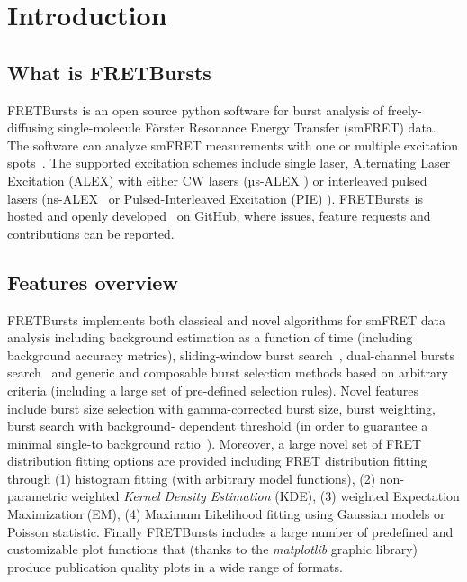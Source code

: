\section{Introduction}

\subsection{What is FRETBursts}

FRETBursts is an open source python software for burst analysis of freely-diffusing 
single-molecule Förster Resonance Energy Transfer (smFRET) data. 
The software can analyze smFRET measurements
with one or multiple excitation spots~\cite{Ingargiola_2013}. The supported 
excitation schemes include single laser, Alternating Laser Excitation (ALEX) 
with either CW lasers (µs-ALEX \cite{Kapanidis_2005}) 
or interleaved pulsed lasers (ns-ALEX~\cite{Laurence_2005} or 
Pulsed-Interleaved Excitation (PIE) \cite{M_ller_2005}). 
FRETBursts is hosted and openly developed~\cite{Prli__2012} on GitHub, where
issues, feature requests and contributions can be reported.

\subsection{Features overview}

FRETBursts implements both classical and novel algorithms for smFRET data analysis 
including background estimation as a function of time (including background accuracy 
metrics), sliding-window burst search~\cite{Eggeling_1998}, dual-channel bursts search~\cite{Nir_2006} and
generic and composable burst selection methods based on arbitrary criteria 
(including a large set of pre-defined selection rules). Novel features include burst size
selection with gamma-corrected burst size, burst weighting, burst search with background-
dependent threshold (in order to guarantee a minimal single-to background ratio~\cite{Michalet_2012}).
Moreover, a large novel set of FRET distribution fitting options are provided including
FRET distribution fitting through (1) histogram fitting (with arbitrary model functions), 
(2)  non-parametric weighted \textit{Kernel Density Estimation} (KDE), (3) weighted 
Expectation Maximization (EM), (4) Maximum Likelihood fitting using Gaussian models 
or Poisson statistic. Finally FRETBursts includes a large number of
predefined and customizable plot functions that (thanks to the \textit{matplotlib} 
graphic library) produce publication quality plots in a wide range of formats.

